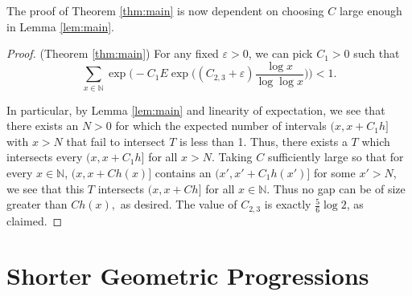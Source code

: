 \documentclass[12pt,english,BCOR7.5mm]{amsart}
\numberwithin{equation}{section}
\numberwithin{figure}{section}
\theoremstyle{definition}
\theoremstyle{plain}
\theoremstyle{plain}
\theoremstyle{plain}
\theoremstyle{definition}
\theoremstyle{plain}
\theoremstyle{plain}
\begin{document}
The proof of Theorem \ref{thm:main} is now dependent on choosing
$C$ large enough in Lemma \ref{lem:main}.
\begin{proof}
(Theorem \ref{thm:main}) For any fixed $\varepsilon>0$, we can pick
$C_{1}>0$ such that
\[
\sum_{x\in\mathbb{N}}\exp\Big(-C_{1}E\exp\Big((C_{2,3}+\varepsilon)\frac{\log x}{\log\log x}\Big)\Big)<1.
\]

In particular, by Lemma \ref{lem:main} and linearity of expectation,
we see that there exists an $N>0$ for which the expected number of
intervals $(x,x+C_{1}h]$ with $x>N$ that fail to intersect $T$
is less than 1. Thus, there exists a $T$ which intersects every $(x,x+C_{1}h]$
for all $x>N$. Taking $C$ sufficiently large so that for every $x\in\mathbb{N}$,
$(x,x+Ch(x)]$ contains an $(x',x'+C_{1}h(x')]$ for some $x'>N$,
we see that this $T$ intersects $(x,x+Ch]$ for all $x\in\mathbb{N}$.
Thus no gap can be of size greater than $Ch(x),$ as desired. The
value of $C_{2,3}$ is exactly $\frac{5}{6}\log2$, as claimed.
\end{proof}

\section*{Shorter Geometric Progressions}
\end{document}
